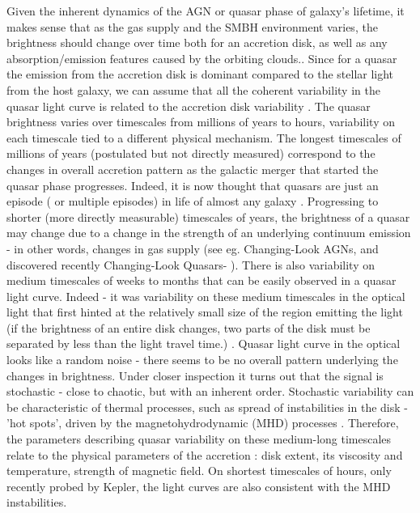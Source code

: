 \documentclass[modern]{aastex62}
\begin{document}
Given the inherent dynamics of the AGN or quasar phase of galaxy's lifetime, it makes sense that as the gas supply and the SMBH environment varies, the brightness should change over time both for an accretion disk, as well as any absorption/emission features caused by the orbiting clouds.\cite{stern2017, schawinski2015}.  Since for a quasar the emission from the accretion disk is dominant compared to the stellar light from the host galaxy, we can assume that all the coherent variability  in the quasar light curve is related to the accretion disk variability . The quasar brightness varies over timescales from millions of years to hours, variability on each timescale tied to a different physical mechanism.  The longest timescales of millions of years (postulated but not directly measured) correspond to the changes in overall accretion pattern as the galactic merger that started the quasar phase progresses.  Indeed, it is now thought that quasars are just an episode ( or multiple episodes) in life of almost any galaxy \citep{alexander2012, kormendy2013}. Progressing to shorter (more directly measurable) timescales of years, the brightness of a  quasar may change due to a change in the strength of an underlying continuum emission - in other words, changes in gas supply (see eg. Changing-Look AGNs, and discovered recently Changing-Look Quasars- \cite{ruan2016, macleod2016, graham2017}). There is also variability on medium timescales of weeks to months that can be easily observed in a quasar light curve. Indeed - it was variability on these medium timescales  in the optical light that first hinted at the relatively small size of the region emitting the light (if the brightness of an entire disk changes, two parts of the disk must be separated by less than the light travel time.) \cite{mudd2017, blackburne2011, morgan2010}. Quasar light curve in the optical looks like a random noise - there seems to be no overall pattern underlying the changes in brightness. Under closer inspection it turns out that the signal is stochastic - close to chaotic, but with an inherent order. Stochastic variability can be characteristic of thermal processes, such as spread of instabilities in the disk - 'hot spots', driven by the magnetohydrodynamic (MHD) processes \citep{kelly2007, zu2013, kozlowski2016a}. Therefore, the parameters describing quasar variability on these medium-long timescales relate to the physical parameters of the accretion : disk extent, its viscosity and temperature, strength of magnetic field. On shortest timescales of hours, only recently probed by Kepler, the light curves are also consistent with  the MHD instabilities\citep{dexter2011, kasliwal2015a, aranzana2018, smith2018}.
\end{document}
